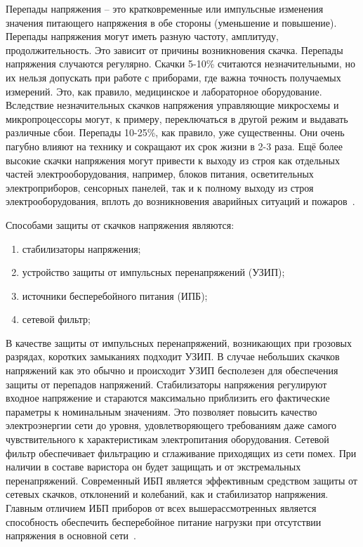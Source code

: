 Перепады напряжения – это кратковременные
или импульсные изменения значения питающего напряжения в обе стороны (уменьшение и
повышение). Перепады напряжения могут иметь разную частоту, амплитуду,
продолжительность. Это зависит от причины возникновения скачка. Перепады напряжения
случаются регулярно. Скачки 5-10\% считаются незначительными, но их нельзя допускать
при работе с приборами, где важна точность получаемых измерений. Это, как правило,
медицинское и лабораторное оборудование. Вследствие незначительных скачков
напряжения управляющие микросхемы и микропроцессоры могут, к примеру,
переключаться в другой режим и выдавать различные сбои. Перепады 10-25\%, как правило,
уже существенны. Они очень пагубно влияют на технику и сокращают их срок жизни в 2-3
раза. Ещё более высокие скачки напряжения могут привести к выходу из строя как
отдельных частей электрооборудования, например, блоков питания, осветительных
электроприборов, сенсорных панелей, так и к полному выходу из строя
электрооборудования, вплоть до возникновения аварийных ситуаций и пожаров~\cite{power_manual}. 

Способами защиты от скачков напряжения являются:
\begin{enumerate}
    \item стабилизаторы напряжения;
    \item устройство защиты от импульсных перенапряжений (УЗИП);
    \item источники бесперебойного питания (ИПБ);
    \item сетевой фильтр;
\end{enumerate}

В качестве защиты от импульсных перенапряжений, возникающих при грозовых разрядах, 
коротких замыканиях подходит УЗИП. В случае небольших скачков
напряжений как это обычно и происходит УЗИП бесполезен для обеспечения защиты от перепадов 
напряжений. Стабилизаторы напряжения
регулируют входное напряжение и стараются максимально приблизить его фактические параметры 
к номинальным значениям. Это позволяет
повысить качество электроэнергии сети до уровня, удовлетворяющего требованиям даже самого 
чувствительного к характеристикам электропитания оборудования.
Сетевой фильтр обеспечивает фильтрацию и сглаживание приходящих из сети помех. При наличии 
в составе варистора он будет защищать и от экстремальных перенапряжений. 
Современный ИБП является эффективным средством защиты от сетевых скачков, отклонений и 
колебаний, как и стабилизатор напряжения.
Главным отличием ИБП приборов от всех вышерассмотренных является способность обеспечить 
бесперебойное питание нагрузки при отсутствии напряжения в основной сети~\cite{power_aplications}. 


